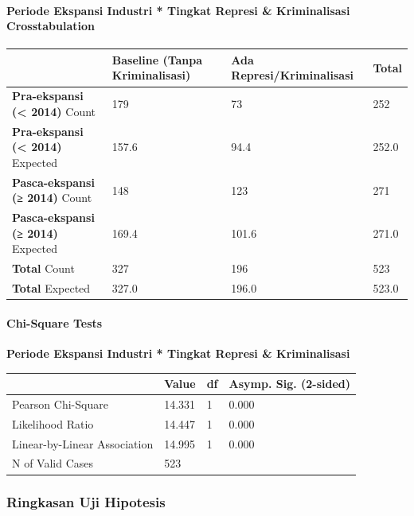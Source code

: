 \documentclass[
]{article}
\newcounter{none} %
\begin{document}
\paragraph{Periode Ekspansi Industri * Tingkat Represi \& Kriminalisasi
Crosstabulation}\label{periode-ekspansi-industri-tingkat-represi-kriminalisasi-crosstabulation}

{\def\LTcaptype{none} %
\begin{longtable}[]{@{}llll@{}}
\toprule\noalign{}
& Baseline (Tanpa Kriminalisasi) & Ada Represi/Kriminalisasi & Total \\
\midrule\noalign{}
\endhead
\bottomrule\noalign{}
\endlastfoot
\textbf{Pra-ekspansi (\textless{} 2014)} Count & 179 & 73 & 252 \\
\textbf{Pra-ekspansi (\textless{} 2014)} Expected & 157.6 & 94.4 &
252.0 \\
\textbf{Pasca-ekspansi (≥ 2014)} Count & 148 & 123 & 271 \\
\textbf{Pasca-ekspansi (≥ 2014)} Expected & 169.4 & 101.6 & 271.0 \\
\textbf{Total} Count & 327 & 196 & 523 \\
\textbf{Total} Expected & 327.0 & 196.0 & 523.0 \\
\end{longtable}
}

\paragraph{Chi-Square Tests}\label{chi-square-tests}

\textbf{Periode Ekspansi Industri * Tingkat Represi \& Kriminalisasi}

{\def\LTcaptype{none} %
\begin{longtable}[]{@{}llll@{}}
\toprule\noalign{}
& Value & df & Asymp. Sig. (2-sided) \\
\midrule\noalign{}
\endhead
\bottomrule\noalign{}
\endlastfoot
Pearson Chi-Square & 14.331 & 1 & 0.000 \\
Likelihood Ratio & 14.447 & 1 & 0.000 \\
Linear-by-Linear Association & 14.995 & 1 & 0.000 \\
N of Valid Cases & 523 & & \\
\end{longtable}
}

\subsubsection{Ringkasan Uji Hipotesis}\label{ringkasan-uji-hipotesis}
\end{document}
